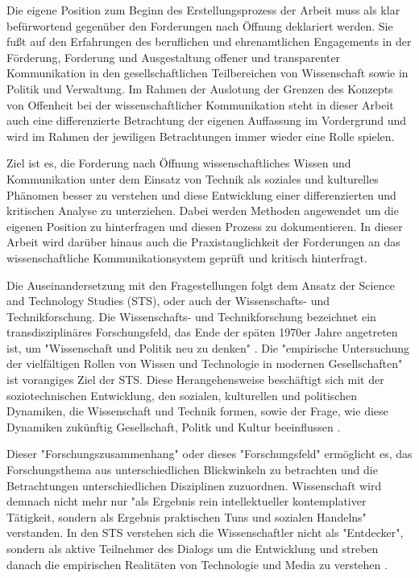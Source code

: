 Die eigene Position zum Beginn des Erstellungsprozess der Arbeit muss als klar befürwortend gegenüber den Forderungen nach Öffnung deklariert werden. Sie fußt auf den Erfahrungen des beruflichen und ehrenamtlichen Engagements in der Förderung, Forderung und Ausgestaltung offener und transparenter Kommunikation in den gesellschaftlichen Teilbereichen von Wissenschaft sowie in Politik und Verwaltung. Im Rahmen der Auslotung der Grenzen des Konzepts von Offenheit bei der wissenschaftlicher Kommunikation steht in dieser Arbeit auch eine differenzierte Betrachtung der eigenen Auffassung im Vordergrund und wird im Rahmen der jewiligen Betrachtungen immer wieder eine Rolle spielen.

Ziel ist es, die Forderung nach Öffnung wissenschaftliches Wissen und Kommunikation unter dem Einsatz von Technik als soziales und kulturelles Phänomen besser zu verstehen und diese Entwicklung einer differenzierten und kritischen Analyse zu unterziehen. Dabei werden Methoden angewendet um die eigenen Position zu hinterfragen und diesen Prozess zu dokumentieren. In dieser Arbeit wird darüber hinaus auch die Praxistauglichkeit der Forderungen an das wissenschaftliche Kommunikationsystem geprüft und kritisch hinterfragt.

Die Auseinandersetzung mit den Fragestellungen folgt dem Ansatz der Science and Technology Studies (STS), oder auch der Wissenschafts- und Technikforschung. Die Wissenschafts- und Technikforschung bezeichnet ein transdisziplinäres Forschungsfeld, das Ende der späten 1970er Jahre angetreten ist, um "Wissenschaft und Politik neu zu denken" \cite{Potthast_2010}. Die "empirische Untersuchung der vielfältigen Rollen von Wissen und Technologie in modernen Gesellschaften"\cite{beck_2014_science} ist vorangiges Ziel der STS. Diese Herangehensweise beschäftigt sich mit der soziotechnischen Entwicklung, den sozialen, kulturellen und politischen Dynamiken, die Wissenschaft und Technik formen, sowie der Frage, wie diese Dynamiken zukünftig Gesellschaft, Politk und Kultur beeinflussen \cite{suchen}.

Dieser "Forschungszusammenhang"\cite{Potthast_2010} oder dieses "Forschungsfeld" \cite{beck_2014_science} ermöglicht es, das Forschungsthema aus unterschiedlichen Blickwinkeln zu betrachten und die Betrachtungen unterschiedlichen Disziplinen zuzuordnen. Wissenschaft wird demnach nicht mehr nur "als Ergebnis rein intellektueller kontemplativer Tätigkeit, sondern als Ergebnis praktischen Tuns und sozialen Handelns" \cite{beck_2014_science} verstanden. In den STS verstehen sich die Wissenschaftler nicht als "Entdecker", sondern als aktive Teilnehmer des Dialogs um die Entwicklung \cite{MacKenzie_STS_1999} und streben danach die empirischen Realitäten von Technologie und Media zu verstehen \cite{kelty_2014_freedom}.

